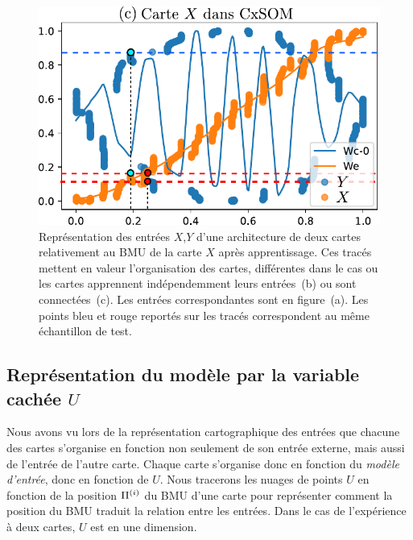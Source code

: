 \begin{figure}
\begin{minipage}{0.38\textwidth}
\includegraphics[width=\textwidth]{weights_2som.pdf}
\end{minipage}

\caption{Représentation des entrées $X$,$Y$ d'une architecture de deux cartes relativement au BMU de la carte $X$ après apprentissage. Ces tracés mettent en valeur l'organisation des cartes, différentes dans le cas ou les cartes apprennent indépendemment leurs entrées~(b) ou sont connectées~(c). Les entrées correspondantes sont en figure~(a). Les points bleu et rouge reportés sur les tracés correspondent au même échantillon de test.\label{fig:inputs}}
\end{figure}

\subsection{Représentation du modèle par la variable cachée $U$}

Nous avons vu lors de la représentation cartographique des entrées que chacune des cartes s'organise en fonction non seulement de son entrée externe, mais aussi de l'entrée de l'autre carte. Chaque carte s'organise donc en fonction du \emph{modèle d'entrée}, donc en fonction de $U$.
Nous tracerons les nuages de points $U$ en fonction de la position $\Pi^{({i})}$ du BMU d'une carte pour représenter comment la position du BMU traduit la relation entre les entrées. Dans le cas de l'expérience à deux cartes, $U$ est en une dimension.

